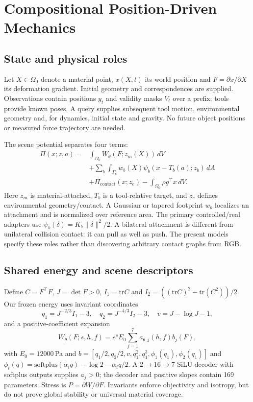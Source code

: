 \documentclass[10pt,twocolumn,letterpaper]{article}
\begin{document}
\section{Compositional Position-Driven Mechanics}
\subsection{State and physical roles}
Let $X\in\Omega_0$ denote a material point, $x(X,t)$ its world position and $F=\partial x/\partial X$ its deformation gradient. Initial geometry and correspondences are supplied. Observations contain positions $y_t$ and validity masks $V_t$ over a prefix; tools provide known poses. A query supplies subsequent tool motion, environmental geometry and, for dynamics, initial state and gravity. No future object positions or measured force trajectory are needed.

The scene potential separates four terms:
\begin{align}\label{eq:total}
\Pi(x;z,a)={}&\int_{\Omega_0} W_\theta(F;z_m(X))\,dV\nonumber\\
 &+\sum_b\int_{\Gamma_b}w_b(X)\psi_b(x-T_b(a);z_b)\,dA\nonumber\\
 &+\Pi_{\mathrm{contact}}(x;z_e)-\int_{\Omega_0}\rho g^\top x\,dV.
\end{align}
Here $z_m$ is material-attached, $T_b$ is a tool-relative target, and $z_e$ defines environmental geometry/contact. A Gaussian or tapered footprint $w_b$ localizes an attachment and is normalized over reference area. The primary controlled/real adapters use $\psi_b(\delta)=K_b\|\delta\|^2/2$. A bilateral attachment is different from unilateral collision contact: it can pull as well as push. The present models specify these roles rather than discovering arbitrary contact graphs from RGB.

\subsection{Shared energy and scene descriptors}
Define $C=F^\top F$, $J=\det F>0$, $I_1=\mathrm{tr}C$ and $I_2=((\mathrm{tr}C)^2-\mathrm{tr}(C^2))/2$. Our frozen energy uses invariant coordinates
\begin{equation}
q_1=J^{-2/3}I_1-3,\quad q_2=J^{-4/3}I_2-3,\quad v=J-\log J-1,
\end{equation}
and a positive-coefficient expansion
\begin{equation}\label{eq:bulk}
W_\theta(F;s,h,f)=e^s E_0\sum_{j=1}^{7}a_{\theta,j}(h,f)b_j(F),
\end{equation}
with $E_0=12000$\,Pa and $b=[q_1/2,q_2/2,v,q_1^2,q_1^3,\phi_1(q_1),\phi_2(q_1)]$ and $\phi_i(q)=\mathrm{softplus}(\alpha_iq)-\log2-\alpha_iq/2$. A $2\!\to\!16\!\to\!7$ SiLU decoder with softplus outputs supplies $a_j>0$; the decoder and positive slopes contain 169 parameters. Stress is $P=\partial W/\partial F$. Invariants enforce objectivity and isotropy, but do not prove global stability or universal material coverage.
\end{document}
